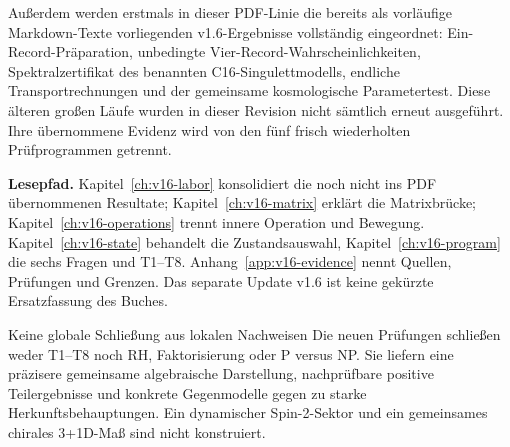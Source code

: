 Außerdem werden erstmals in dieser PDF-Linie die bereits als vorläufige Markdown-Texte vorliegenden v1.6-Ergebnisse vollständig eingeordnet: Ein-Record-Präparation, unbedingte Vier-Record-Wahrscheinlichkeiten, Spektralzertifikat des benannten C16-Singulettmodells, endliche Transportrechnungen und der gemeinsame kosmologische Parametertest. Diese älteren großen Läufe wurden in dieser Revision nicht sämtlich erneut ausgeführt. Ihre übernommene Evidenz wird von den fünf frisch wiederholten Prüfprogrammen getrennt.

\textbf{Lesepfad.} Kapitel~\ref{ch:v16-labor} konsolidiert die noch nicht ins PDF übernommenen Resultate; Kapitel~\ref{ch:v16-matrix} erklärt die Matrixbrücke; Kapitel~\ref{ch:v16-operations} trennt innere Operation und Bewegung. Kapitel~\ref{ch:v16-state} behandelt die Zustandsauswahl, Kapitel~\ref{ch:v16-program} die sechs Fragen und T1--T8. Anhang~\ref{app:v16-evidence} nennt Quellen, Prüfungen und Grenzen. Das separate Update v1.6 ist keine gekürzte Ersatzfassung des Buches.

\begin{grenze}{Keine globale Schließung aus lokalen Nachweisen}
Die neuen Prüfungen schließen weder T1--T8 noch RH, Faktorisierung oder P versus NP. Sie liefern eine präzisere gemeinsame algebraische Darstellung, nachprüfbare positive Teilergebnisse und konkrete Gegenmodelle gegen zu starke Herkunftsbehauptungen. Ein dynamischer Spin-2-Sektor und ein gemeinsames chirales 3+1D-Maß sind nicht konstruiert.
\end{grenze}

